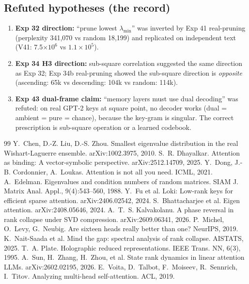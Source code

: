 \documentclass[11pt]{article}
\begin{document}
\subsection{Refuted hypotheses (the record)}
\begin{enumerate}
\item \textbf{Exp 32 direction:} ``prune lowest $\lambda_{\min}$''
  was inverted by Exp 41 real-pruning (perplexity 341,070 vs random
  18,199) and replicated on independent text (V41: 7.5$\times 10^6$
  vs $1.1 \times 10^5$).
\item \textbf{Exp 34 H3 direction:} sub-square correlation suggested
  the same direction as Exp 32; Exp 34b real-pruning showed the
  sub-square direction is \emph{opposite} (ascending: 65k vs
  descending: 104k vs random: 114k).
\item \textbf{Exp 43 dual-frame claim:} ``memory layers must use dual
  decoding'' was refuted: on real GPT-2 keys at square point, no
  decoder works (dual = ambient = pure = chance), because the
  key-gram is singular. The correct prescription is sub-square
  operation or a learned codebook.
\end{enumerate}


\begin{thebibliography}{99}
 Y.~Chen, D.-Z. Liu, D.-S. Zhou.
  Smallest eigenvalue distribution in the real Wishart-Laguerre ensemble.
  arXiv:1002.3975, 2010.
 S.~R. Dhayalkar.
  Attention as binding: A vector-symbolic perspective. arXiv:2512.14709, 2025.
 Y.~Dong, J.-B. Cordonnier,
  A.~Loukas. Attention is not all you need. ICML, 2021.
 A.~Edelman.
  Eigenvalues and condition numbers of random matrices.
  SIAM J. Matrix Anal. Appl., 9(4):543--560, 1988.
 Y.~Fu et al. Loki: Low-rank keys
  for efficient sparse attention. arXiv:2406.02542, 2024.
 S.~Bhattacharjee
  et al. Eigen attention. arXiv:2408.05646, 2024.
 A.~T.~S. Kalvakolanu.
  A phase reversal in rank collapse under SVD compression.
  arXiv:2609.06341, 2026.
 P.~Michel, O.~Levy,
  G.~Neubig. Are sixteen heads really better than one? NeurIPS, 2019.
 K.~Nait-Saada
  et al. Mind the gap: spectral analysis of rank collapse. AISTATS, 2025.
 T.~A. Plate.
  Holographic reduced representations. IEEE Trans. NN, 6(3), 1995.
 A.~Sun, H.~Zhang,
  H.~Zhou, et al. State rank dynamics in linear attention LLMs.
  arXiv:2602.02195, 2026.
 E.~Voita, D.~Talbot,
  F.~Moiseev, R.~Sennrich, I.~Titov. Analyzing multi-head
  self-attention. ACL, 2019.
\end{thebibliography}
\end{document}
